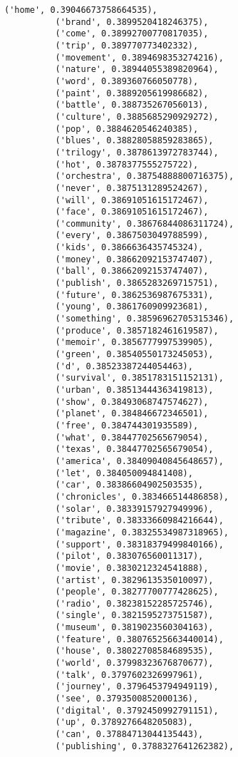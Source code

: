 \documentclass[11pt]{article}
\begin{document}
\begin{Verbatim}[commandchars=\\\{\}]
          ('home', 0.39046673758664535),
          ('brand', 0.3899520418246375),
          ('come', 0.38992700770817035),
          ('trip', 0.389770773402332),
          ('movement', 0.3894698353274216),
          ('nature', 0.38944055389820964),
          ('word', 0.389360766050778),
          ('paint', 0.3889205619986682),
          ('battle', 0.388735267056013),
          ('culture', 0.3885685290929272),
          ('pop', 0.3884620546240385),
          ('blues', 0.38828058859283865),
          ('trilogy', 0.3878613972783744),
          ('hot', 0.3878377555275722),
          ('orchestra', 0.38754888800716375),
          ('never', 0.3875131289524267),
          ('will', 0.38691051615172467),
          ('face', 0.38691051615172467),
          ('community', 0.38676844086311724),
          ('every', 0.3867503049788599),
          ('kids', 0.3866636435745324),
          ('money', 0.38662092153747407),
          ('ball', 0.38662092153747407),
          ('publish', 0.3865283269715751),
          ('future', 0.3862536987675331),
          ('young', 0.3861760909923681),
          ('something', 0.38596962705315346),
          ('produce', 0.3857182461619587),
          ('memoir', 0.3856777997539905),
          ('green', 0.38540550173245053),
          ('d', 0.38523387244054463),
          ('survival', 0.3851783151152131),
          ('urban', 0.38513444363419813),
          ('show', 0.38493068747574627),
          ('planet', 0.384846672346501),
          ('free', 0.384744301935589),
          ('what', 0.38447702565679054),
          ('texas', 0.38447702565679054),
          ('america', 0.38409040845648657),
          ('let', 0.384050094841408),
          ('car', 0.38386604902503535),
          ('chronicles', 0.383466514486858),
          ('solar', 0.38339157927949996),
          ('tribute', 0.38333660984216644),
          ('magazine', 0.38325534987318965),
          ('support', 0.38318379499840166),
          ('pilot', 0.383076560011317),
          ('movie', 0.3830212324541888),
          ('artist', 0.3829613535010097),
          ('people', 0.38277700777428625),
          ('radio', 0.38238152285725746),
          ('single', 0.3821595273751587),
          ('museum', 0.3819023560304163),
          ('feature', 0.38076525663440014),
          ('house', 0.38022708584689535),
          ('world', 0.37998323676870677),
          ('talk', 0.3797602326997961),
          ('journey', 0.3796453794949119),
          ('see', 0.3793500852000136),
          ('digital', 0.3792450992791151),
          ('up', 0.3789276648205083),
          ('can', 0.37884713044135443),
          ('publishing', 0.3788327641262382),

\end{Verbatim}
\end{document}
